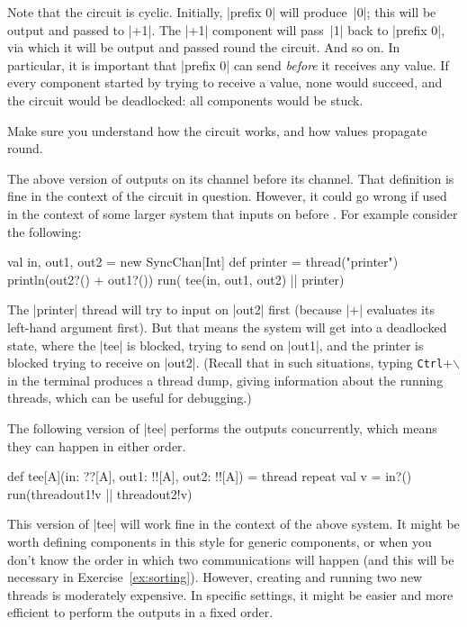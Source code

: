 Note that the circuit is cyclic.  Initially, |prefix 0| will produce~|0|; this
will be output and passed to |+1|.  The |+1| component will pass~|1| back to
|prefix 0|, via which it will be output and passed round the circuit.  And so
on.  In particular, it is important that |prefix 0| can send \emph{before} it
receives any value.  If every component started by trying to receive a value,
none would succeed, and the circuit would be deadlocked: all
components would be stuck.

\begin{instruction}
Make sure you understand how the circuit works, and how values propagate
round.
\end{instruction}

The above version of  outputs on its  channel before
its  channel.  That definition is fine in the context of the
circuit in question.  However, it could go wrong if used in the context of
some larger system that inputs on  before .  For
example consider the following:
%
\begin{scala}
  val in, out1, out2 = new SyncChan[Int]
  def printer = thread("printer"){ println(out2?() + out1?()) } 
  run( tee(in, out1, out2) || printer)
\end{scala}
%
The |printer| thread will try to input on |out2| first (because |+| evaluates
its left-hand argument first).  But that means the system will get into a
deadlocked state, where the |tee| is blocked, trying to send
on |out1|, and the printer is blocked trying to receive on |out2|.  (Recall
that in such situations, typing \texttt{Ctrl}+$\backslash$ in the terminal
produces a thread dump, giving information about the running threads, which
can be useful for debugging.)


The following version of |tee| performs the outputs concurrently, which means
they can happen in either order.
%
\begin{mysamepage}
\begin{scala}
  def tee[A](in: ??[A], out1: !![A], out2: !![A]) = thread{
    repeat{ 
      val v = in?()
      run(thread{out1!v} || thread{out2!v}) 
    }
  }
\end{scala}
\end{mysamepage}
%
This version of |tee| will work fine in the context of the above system.  It
might be worth defining components in this style for generic components, or
when you don't know the order in which two communications will happen (and
this will be necessary in Exercise~\ref{ex:sorting}).  However, creating and
running two new threads is moderately expensive.  In specific settings, it
might be easier and more efficient to perform the outputs in a fixed order.
